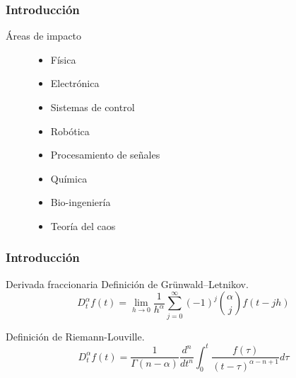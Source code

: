 \documentclass[10pt]{beamer}
\begin{document}
	\begin{frame}
		\frametitle{Introducción}
		\begin{block}{Áreas de impacto}
		\begin{figure}[!h]
				\begin{minipage}[c]{0.48\textwidth}
					\begin{itemize}
								\justifying
								\item Física
								\item Electrónica
								\item Sistemas de control
								\item Robótica 
					\end{itemize}
				\end{minipage} \hfill \begin{minipage}[c]{0.48\textwidth}
					\begin{itemize}
								\justifying
								\item Procesamiento de señales
								\item Química
								\item Bio-ingeniería
								\item {\color{red} Teoría del caos}
					\end{itemize}
				\end{minipage}
			\end{figure}
		\end{block}
	\end{frame}		
	
	\begin{frame}
		\frametitle{Introducción}
		\begin{block}{Derivada fraccionaria}
		Definición de Grünwald–Letnikov.
			\begin{equation}
				D^{\alpha}_{t} f(t) = \lim_{h \to 0} \frac{1}{h^{\alpha}}   \sum_{j = 0}^{\infty} (-1)^{j} \binom{\alpha}{j} f(t - jh)
			\end{equation}
			
		Definición de Riemann-Louville.
			\begin{equation}
				D^{\alpha}_{t} f(t) = \frac{1}{\Gamma(n-\alpha)} \frac{d^{n}}{dt^{n}} \int_{0}^{t} \frac{f(\tau)}{(t-\tau)^{\alpha -n +1}} d\tau
			\end{equation}
		\end{block}
	\end{frame}
	
\end{document}
